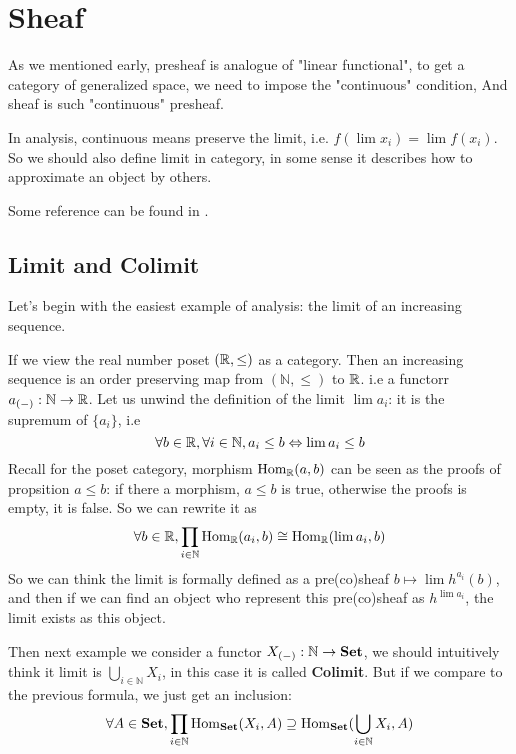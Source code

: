 \chapter{Sheaf}\label{chap:Sheaf} %

As we mentioned early, presheaf is analogue of "linear functional", to get a category of generalized space, we need to impose the "continuous" condition, And sheaf is such "continuous" presheaf. 

In analysis, continuous means preserve the limit, i.e. $f(\lim x_i)=\lim f(x_i)$. So we should also define limit in category, in some sense it describes how to approximate an object by others.

Some reference can be found in \cite{maclane2012sheaves}. 
\section{Limit and Colimit}

Let's begin with the easiest example of analysis: the limit of an increasing sequence.

If we view the real number poset $(\mathbb{R}, \leq)$ as a category. Then an increasing sequence is an order preserving map from $(\mathbb{N},\leq)$ to $\mathbb{R}$. i.e a functorr
$a_{(-)}:\mathbb{N} \to \mathbb{R}$. Let us unwind the definition of the limit $ \lim a_i$: it is the supremum of $\{a_i\}$, i.e
\[
 \forall b\in \mathbb{R}, \forall i \in \mathbb{N}, a_i \leq b \Leftrightarrow \lim a_i \leq b
\]
Recall for the poset category, morphism $ \mathrm{Hom}_{\mathbb{R}}(a,b)$ can be seen as the proofs of propsition $a\leq b$: if there a morphism, $a \leq b$ is true, otherwise the proofs is empty, it is false. So we can rewrite it as
\[
  \forall b\in \mathbb{R}, \prod_{ i \in \mathbb{N}} \mathrm{Hom}_{\mathbb{R}}(a_i , b) \cong \mathrm{Hom}_{\mathbb{R}}(\lim a_i, b)
\]
So we can think the limit is formally defined as a pre(co)sheaf $b \mapsto \lim h^{a_i}(b)$, and then if we can find an object who represent this pre(co)sheaf as $h^{\lim a_i}$, the limit exists as this object.

Then next example we consider a functor $X_{(-)}: \mathbb{N} \to \mathbf{Set}$, we should intuitively think it limit is $\bigcup_{i\in \mathbb{N}} X_i$, in this case it is called \textbf{Colimit}. But if we compare to the previous formula, we just get an inclusion:
\[
  \forall A\in \mathbf{Set}, \prod_{ i \in \mathbb{N}} \mathrm{Hom}_{\mathbf{Set}}(X_i , A) \supseteq \mathrm{Hom}_{\mathbf{Set}}(\bigcup_{i\in \mathbb{N}} X_i, A)
\]

